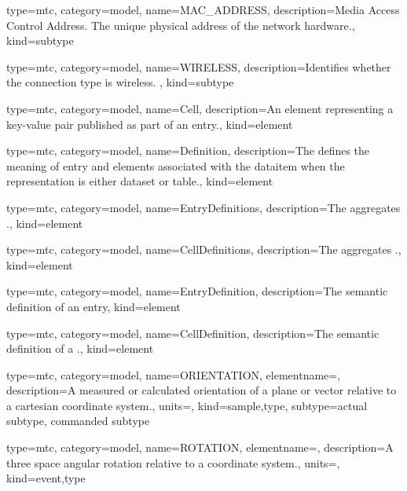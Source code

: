{
  type=mtc,
  category=model,
  name={MAC\_ADDRESS},
  description={Media Access Control Address.  The unique physical address of the network hardware.},
  kind={subtype}
}


{
  type=mtc,
  category=model,
  name={WIRELESS},
  description={Identifies whether the connection type is wireless.  },
  kind={subtype}
}


{
  type=mtc,
  category=model,
  name={Cell},
  description={An element representing a \gls{key-value pair} published as part of an \gls{entry}.},
  kind={element}
}


{
  type=mtc,
  category=model,
  name={Definition},
  description={The  defines the meaning of \gls{entry} and  elements associated with the \gls{dataitem} when the \gls{representation} is either \gls{dataset} or \gls{table}.},
  kind={element}
}


{
  type=mtc,
  category=model,
  name={EntryDefinitions},
  description={The  aggregates  .},
  kind={element}
}


{
  type=mtc,
  category=model,
  name={CellDefinitions},
  description={The  aggregates .},
  kind={element}
}


{
  type=mtc,
  category=model,
  name={EntryDefinition},
  description={The semantic definition of an \gls{entry}},
  kind={element}
}


{
  type=mtc,
  category=model,
  name={CellDefinition},
  description={The semantic definition of a .},
  kind={element}
}


{
  type=mtc,
  category=model,
  name={ORIENTATION},
  elementname=,
  description={A measured or calculated orientation of a plane or vector relative to a cartesian coordinate system.},
  units=,
  kind={sample,type},
  subtype={\gls{actual subtype}, \gls{commanded subtype}}
}


{
  type=mtc,
  category=model,
  name={ROTATION},
  elementname=,
  description={A three space angular rotation relative to a coordinate system.},
  units=,
  kind={event,type}
}


